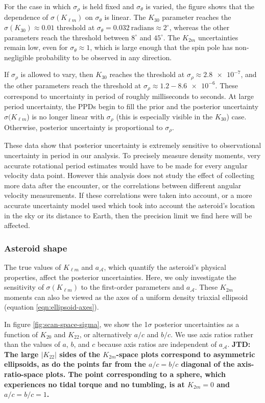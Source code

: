 \documentclass[fleqn,usenatbib]{mnras}
\newcommand{\jtd}[1]{ {\bf{\color{red} JTD: #1}} }
\begin{document}
For the case in which $\sigma_\rho$ is held fixed and $\sigma_\theta$ is varied, the figure shows that the dependence of $\sigma(K_{\ell m})$ on $\sigma_\theta$ is linear. The $K_{30}$ parameter reaches the $\sigma(K_{30})\approx 0.01$ threshold at $\sigma_\theta = 0.032\ \text{radians} \approx 2^\circ$, whereas the other parameters reach the threshold between $8^\circ$ and $45^\circ$. The $K_{2m}$ uncertainties remain low, even for $\sigma_\theta \approx 1$, which is large enough that the spin pole has non-negligible probability to be observed in any direction.

If $\sigma_\rho$ is allowed to vary, then $K_{30}$ reaches the threshold at $\sigma_\rho \approx \num{2.8e-7}$, and the other parameters reach the threshold at $\sigma_\rho \approx 1.2-\num{8.6e-6}$. These correspond to uncertainty in period of roughly milliseconds to seconds. At large period uncertainty, the PPDs begin to fill the prior and the posterior uncertainty $\sigma(K_{\ell m}$) is no longer linear with $\sigma_\rho$ (this is especially visible in the $K_{30}$) case. Otherwise, posterior uncertainty is proportional to $\sigma_\rho$.

These data show that posterior uncertainty is extremely sensitive to observational uncertainty in period in our analysis. To precisely measure density moments, very accurate rotational period estimates would have to be made for every angular velocity data point. However this analysis does not study the effect of collecting more data after the encounter, or the correlations between different angular velocity measurements. If these correlations were taken into account, or a more accurate uncertainty model used which took into account the asteroid's location in the sky or its distance to Earth, then the precision limit we find here will be affected.


\subsubsection{Asteroid shape}
\label{sec:scan-shape}

The true values of $K_{\ell m}$ and $a_\mathcal{A}$, which quantify the asteroid's physical properties, affect the posterior uncertainties. Here, we only investigate the sensitivity of $\sigma(K_{\ell m})$ to the first-order parameters and $a_\mathcal{A}$. These $K_{2m}$ moments can also be viewed as the axes of a uniform density triaxial ellipsoid (equation \ref{eqn:ellipsoid-axes}).

In figure \ref{fig:scan-space-sigma}, we show the 1$\sigma$ posterior uncertainties as a function of $K_{20}$ and $K_{22}$, or alternatively $a/c$ and $b/c$. We use axis ratios rather than the values of $a$, $b$, and $c$ because axis ratios are independent of $a_\mathcal{A}$. \jtd{The large $|K_{22}|$ sides of the $K_{2m}$-space plots correspond to asymmetric ellipsoids, as do the points far from the $a/c=b/c$ diagonal of the axis-ratio-space plots. The point corresponding to a sphere, which experiences no tidal torque and no tumbling, is at $K_{2m}=0$ and $a/c=b/c=1$.}
\end{document}
